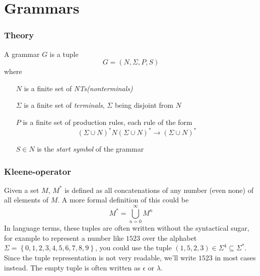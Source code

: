\documentclass[a4paper]{article}
\newcommand{\tuple}[1]{\left( #1 \right)}
\newcommand{\set}[1]{\left\lbrace #1 \right\rbrace}
\begin{document}

\section*{Grammars}
\subsubsection*{Theory}
A grammar $G$ is a tuple 
$$ G = \tuple{N, \Sigma, P, S} $$
where \begin{itemize}
\item[$N$] is a finite set of \textit{NTs(nonterminals)}
\item[$\Sigma$] is a finite set of \textit{terminals}, $\Sigma$ being disjoint from $N$
\item[$P$] is a finite set of production rules, each rule of the form 
$$ (\Sigma\cup N)^*N(\Sigma\cup N)^*\to (\Sigma\cup N)^* $$
\item[$S\in N$] is the \textit{start symbol} of the grammar 
\end{itemize}

\subsubsection*{Kleene-operator}
Given a set $M$, $M^*$ is defined as all concatenations of any number (even none) of all elements of $M$. A more formal definition of this could be 
$$M^* = \bigcup_{n=0}^{\infty}M^n$$
In language terms, these tuples are often written without the syntactical sugar, for example to represent a number like $1523$ over the alphabet $\Sigma=\set{0,1,2,3,4,5,6,7,8,9}$, you could use the tuple $\tuple{1,5,2,3}\in\Sigma^4\subseteq\Sigma^*$. Since the tuple representation is not very readable, we'll write $1523$ in most cases instead. The empty tuple is often written as $\epsilon$ or $\lambda$.
\end{document}
